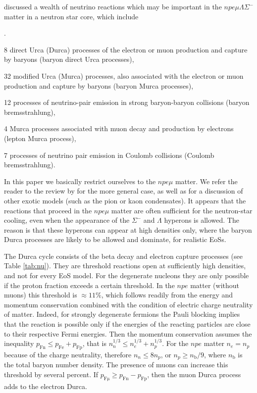 \documentclass[smallextended]{svjour3}       %
\newenvironment{numlist}{
\setcounter{count}{0}
\begin{list}{\arabic{count}.}{
\setlength{\itemsep}{0ex}
\setlength{\parsep}{0pt}
\setlength{\parskip}{0pt}
\setlength{\topsep}{3pt}
\setlength{\partopsep}{3pt}
\usecounter{count}
}}{\end{list}}
\newcounter{count}
\newcommand{\nb}{n_\mathrm{b}}
\begin{document}
\citet{YKGH01} discussed a wealth of neutrino reactions
which may be important in the $npe\mu\Lambda\Sigma^-$ matter
in a neutron star core, which include 
\begin{numlist}
\item 8 direct Urca (Durca)
processes of the electron or muon production and capture by
baryons (baryon direct Urca processes), 

\item 32  modified
Urca (Murca) processes, also associated with the electron or muon
production and capture by baryons (baryon Murca
processes),

\item 12 processes of neutrino-pair emission in
strong baryon-baryon collisions (baryon bremsstrahlung),

\item 4 Murca processes associated with muon decay
and production by electrons (lepton Murca process),

\item 7 processes of neutrino pair emission in Coulomb
collisions (Coulomb bremsstrahlung).
\end{numlist}
In this paper we basically restrict ourselves to the
$npe\mu$ matter. We refer the reader to the review by
\citet{YKGH01} for the more general case, as well as for a
discussion of other exotic models (such as the pion or kaon
condensates). It appears that the reactions that proceed in
the $npe\mu$ matter are often sufficient for the
neutron-star cooling, even when the appearance
of the $\Sigma^-$ and $\Lambda$ hyperons is allowed. The
reason is that these hyperons can appear at high densities
only, where the baryon Durca processes are likely to be
allowed and dominate, for realistic EoSs.

The Durca cycle consists of the beta decay and electron
capture processes (see Table \ref{tab:nu}). They are
threshold reactions open at sufficiently high densities, and
not for every EoS model. For the degenerate nucleons they
are only possible if the proton fraction exceeds a certain
threshold. In the $npe$ matter (without muons) this
threshold is $\approx11\%$, which follows readily from the
energy and momentum conservation combined with the condition
of electric charge neutrality of  matter. Indeed, for
strongly degenerate fermions the Pauli blocking implies that
the reaction is possible only if the energies of the
reacting particles are close to their respective Fermi
energies. Then the momentum conservation assumes the
inequality $p_\mathrm{Fn} \leqslant{p}_\mathrm{Fe}
+{p}_\mathrm{Fp}$, that is $n_n^{1/3} \leqslant n_e^{1/3} +
n_p^{1/3}$. For the $npe$ matter $n_e=n_p$ because of the
charge neutrality, therefore $n_n \leqslant 8n_p$, or
$n_p\geqslant \nb/9$, where $\nb$ is the total baryon number
density. The presence of muons can increase this threshold
by several percent. If 
${p}_\mathrm{F\mu}\geqslant{p}_\mathrm{Fn}-{p}_\mathrm{Fp}$,
then the muon Durca process adds to the
electron Durca.
\end{document}
